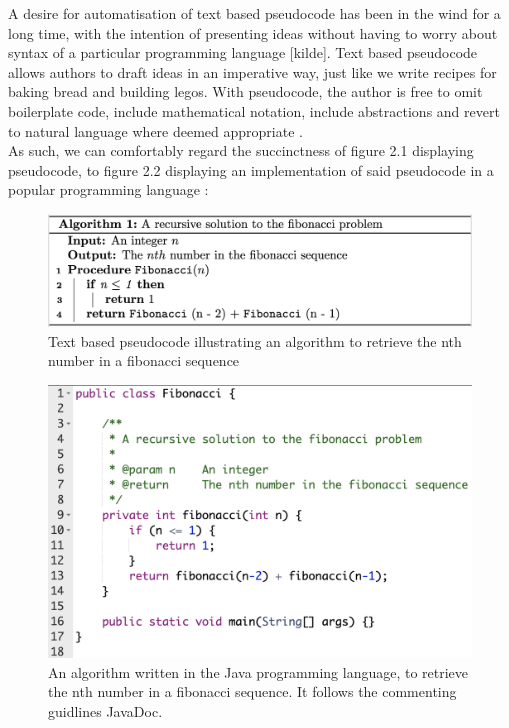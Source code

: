A desire for automatisation of text based pseudocode has been in the wind for a long time, with the intention of presenting ideas without having to worry about syntax of a particular programming language [kilde]. Text based pseudocode allows authors to draft ideas in an imperative way, just like we write recipes for baking bread and building legos. With pseudocode, the author is free to omit boilerplate code, include mathematical notation, include abstractions and revert to natural language where deemed appropriate \cite{BOOK:intro/Cormen/Leiserson}\cite{DBLP:conf/els/Nuallain15}. \hfill \\

As such, we can comfortably regard the succinctness of figure 2.1 displaying pseudocode, to figure 2.2 displaying an implementation of said pseudocode in a popular programming language \cite{LINCOPINIS2023}:

\begin{figure}[ht]
    \centering
    \includegraphics[scale=0.46]{assets/fibonacci_pseudo1.png}
    \caption{Text based pseudocode illustrating an algorithm to retrieve the nth number in a fibonacci sequence}
    \label{fig:fibseq1}
\end{figure}

\begin{figure}[ht]
    \centering
    \includegraphics[scale=0.50]{assets/fibonacci_java.png}
    \caption{An algorithm written in the Java programming language, to retrieve the nth number in a fibonacci sequence. It follows the commenting guidlines JavaDoc\footnotemark.}
    \label{fig:fibjava}
\end{figure}

